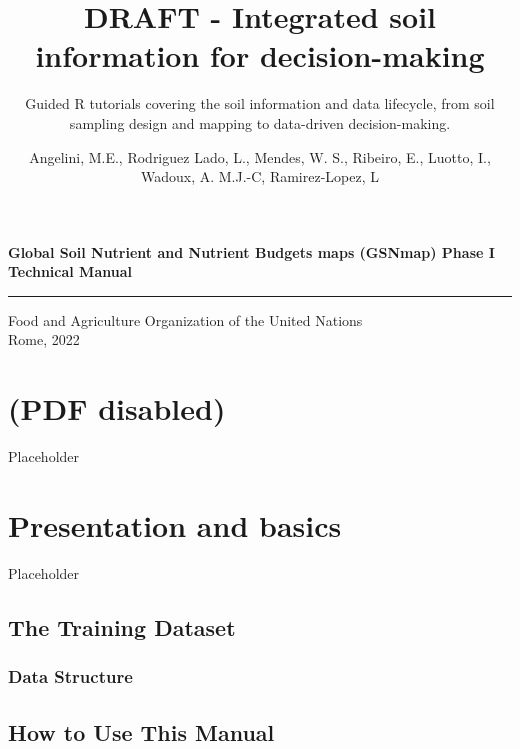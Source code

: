 \documentclass[
  10pt,
  b5paper,
  oneside]{book}
\title{DRAFT - Integrated soil information for decision-making}
\subtitle{Guided R tutorials covering the soil information and data lifecycle, from soil sampling design and mapping to data-driven decision-making.}
\author{Angelini, M.E., Rodriguez Lado, L., Mendes, W. S., Ribeiro, E., Luotto, I., Wadoux, A. M.J.-C, Ramirez-Lopez, L}
\date{}
\newcommand\blankpage{%
    \null
    \thispagestyle{empty}%
    \addtocounter{page}{-1}%
    \newpage}
\begin{document}
\maketitle

\pagestyle{plain}

\afterpage{\blankpage}
\thispagestyle{empty}
\begin{titlepage}
    \begin{center}
        \vspace*{4cm}
        \Large

        \textcolor{astral}{\textbf{Global Soil Nutrient and Nutrient Budgets maps (GSNmap) Phase I\\
Technical Manual\\}}
        \vspace{0.5cm}
        \normalsize
        \vfill
        \noindent
        {\color{astral}\rule{\linewidth}{0.5mm} }

        Food and Agriculture Organization of the United Nations\\
	Rome, 2022
    \end{center}
\end{titlepage}


\chapter{(PDF disabled)}\label{pdf-disabled}

Placeholder

\chapter*{Presentation and basics}\label{presentation-and-basics}

Placeholder

\section*{The Training Dataset}\label{the-training-dataset}

\subsection*{Data Structure}\label{data-structure}

\section*{How to Use This Manual}\label{how-to-use-this-manual}
\end{document}
